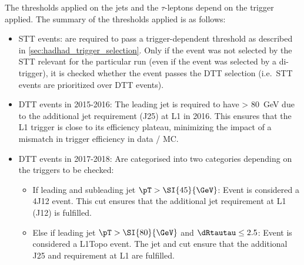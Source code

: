The \pt thresholds applied on the jets and the $\tau$-leptons depend on the trigger applied. The summary of the \pT thresholds applied is as follows:
\begin{itemize}
\item STT events: \tauhadvis are required to pass a trigger-dependent
  \pT threshold as described in
  \cref{sec:hadhad_trigger_selection}. Only if the event was not
  selected by the STT relevant for the particular run (even if the
  event was selected by a di-\tauhad trigger), it is checked whether
  the event passes the DTT selection (i.e.\ STT events are prioritized
  over DTT events).

\item DTT events in 2015-2016: The leading jet is required to have \pT >
  \SI{80}{\GeV} due to the additional jet requirement (J25) at L1 in 2016. This
  ensures that the L1 trigger is close to its efficiency plateau, minimizing the
  impact of a mismatch in trigger efficiency in data / MC.

\item DTT events in 2017-2018: Are categorised into two categories depending on
  the triggers to be checked: %
  \begin{itemize}
  \item If leading and subleading jet $\pT > \SI{45}{\GeV}$: Event is considered a
    4J12 event. This cut ensures that the additional jet requirement at L1 (J12)
    is fulfilled.
  \item Else if leading jet $\pT > \SI{80}{\GeV}$ and $\dRtautau \leq 2.5$:
    Event is considered a L1Topo event. The jet \pT and \dRtautau cut ensure
    that the additional J25 and \dRtautau requirement at L1 are fulfilled.
  \end{itemize}
\end{itemize}

